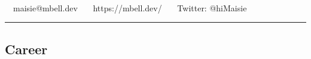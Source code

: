 \documentclass[11pt,a4paper]{article}
\begin{document}
\begin{center}
{\Huge {}}\\


\ \ maisie@mbell.dev \textbullet\
\ \ https://mbell.dev/ \textbullet\
\ \ Twitter: @hiMaisie
\end{center}


\hrule
\vspace{-1.2em}
\subsection*{Career}
\end{document}
